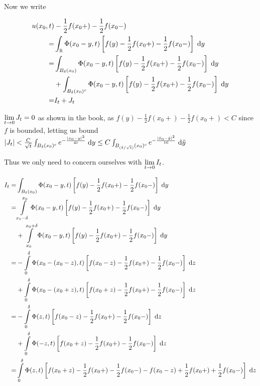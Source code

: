 \begin{enumerate}
  Now we write

  \begin{align*}
  u(x_0, t) & - \frac{1}{2} f(x_0+) - \frac{1}{2} f(x_0-)\\
    = & \int_\reals \Phi(x_0 - y, t) \left[  f(y) - \frac{1}{2} f(x_0+) - \frac{1}{2} f(x_0-) \right] \dy\\
    = & \int_{B_\delta(x_0)} \Phi(x_0 - y, t) \left[  f(y) - \frac{1}{2} f(x_0+) - \frac{1}{2} f(x_0-) \right] \dy\\
      & + \int_{B_\delta(x_0)^c} \Phi(x_0 - y, t) \left[  f(y) - \frac{1}{2} f(x_0+) - \frac{1}{2} f(x_0-) \right] \dy\\
    = & I_t + J_t
  \end{align*}

  $\limitto{t}{0} J_t = 0$ as shown in the book,
  as $f(y) - \frac{1}{2} f(x_0+) - \frac{1}{2} f(x_0+) < C$ since $f$ is bounded,
  letting us bound
  $|J_t| < \frac{C}{\sqrt{t}} \int_{\ball{x_0}{\delta}^c} e^{-\frac{|x_0 - y|^2}{4 t}} \dy \leq C \int_{\ball{x_0}{(\delta / \sqrt{t})}^c} e^{-\frac{|\tilde{x}_0 - \tilde{y}|^2}{16}} \dd{\tilde{y}}$

  Thus we only need to concern ourselves with $\limitto{t}{0} I_t$.

  \begin{align*}
  I_t = &\int_{B_\delta(x_0)} \Phi(x_0 - y, t) \left[ f(y) - \frac{1}{2} f(x_0+) - \frac{1}{2} f(x_0-) \right] \dy\\
      = &\int \limits_{x_0 - \delta}^{x_0} \Phi(x_0 - y, t) \left[ f(y) - \frac{1}{2} f(x_0+) - \frac{1}{2} f(x_0-) \right] \dy\\
        &+ \int \limits_{x_0}^{x_0 + \delta} \Phi(x_0 - y, t) \left[ f(y) - \frac{1}{2} f(x_0+) - \frac{1}{2} f(x_0-) \right] \dy\\
      = &-\int \limits_{0}^{\delta} \Phi(x_0 - (x_0 - z), t) \left[ f(x_0 - z) - \frac{1}{2} f(x_0+) - \frac{1}{2} f(x_0-) \right] \dz\\
        &+ \int \limits_{0}^{\delta} \Phi(x_0 - (x_0 + z), t) \left[  f(x_0 + z) - \frac{1}{2} f(x_0+) - \frac{1}{2} f(x_0-) \right] \dz\\
      = &-\int \limits_{0}^{\delta} \Phi(z, t) \left[ f(x_0 - z) - \frac{1}{2} f(x_0+) - \frac{1}{2} f(x_0-) \right] \dz\\
        &+ \int \limits_{0}^{\delta} \Phi(-z, t) \left[  f(x_0 + z) - \frac{1}{2} f(x_0+) - \frac{1}{2} f(x_0-) \right] \dz\\
      = &\int \limits_{0}^{\delta} \Phi(z, t) \left[ f(x_0 + z) - \frac{1}{2} f(x_0+) - \frac{1}{2} f(x_0-) - f(x_0 - z) + \frac{1}{2} f(x_0+) + \frac{1}{2} f(x_0-)\right] \dz\\
  \end{align*}


\end{enumerate}
